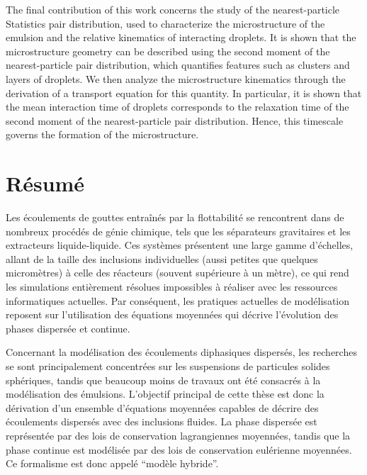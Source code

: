 The final contribution of this work concerns the study of the nearest-particle Statistics pair distribution, used to characterize the microstructure of the emulsion and the relative kinematics   of interacting droplets.
It is shown that the microstructure geometry can be described using the second moment of the nearest-particle pair distribution, which quantifies features such as clusters and layers of droplets.
We then analyze the microstructure kinematics through the derivation of a transport equation for this quantity.
In particular, it is shown that the mean interaction time of droplets corresponds to the relaxation time of the second moment of the nearest-particle pair distribution. 
Hence, this timescale governs the formation of the microstructure.




\newpage
\chapter*{\centering R\'esum\'e}

 
Les \'ecoulements de gouttes entra\^in\'es par la flottabilit\'e se rencontrent dans de nombreux proc\'ed\'es de g\'enie chimique, tels que les s\'eparateurs gravitaires et les extracteurs liquide-liquide.
Ces syst\`emes pr\'esentent une large gamme d'\'echelles, allant de la taille des inclusions individuelles (aussi petites que quelques microm\`etres) \`a celle des r\'eacteurs (souvent sup\'erieure \`a un m\`etre), ce qui rend les simulations enti\`erement r\'esolues impossibles \`a r\'ealiser avec les ressources informatiques actuelles.
Par cons\'equent, les pratiques actuelles de mod\'elisation reposent sur l'utilisation des \'equations moyenn\'ees qui d\'ecrive l'\'evolution des phases dispers\'ee et continue.


Concernant la mod\'elisation des \'ecoulements diphasiques dispers\'es, les recherches se sont principalement concentr\'ees sur les suspensions de particules solides sph\'eriques, tandis que beaucoup moins de travaux ont \'et\'e consacr\'es \`a la mod\'elisation des \'emulsions.
L'objectif principal de cette th\`ese est donc la d\'erivation d'un ensemble d'\'equations moyen\-n\'ees capables de d\'ecrire des \'ecoulements dispers\'es avec des inclusions fluides. 
La phase dispers\'ee est repr\'esent\'ee par des lois de conservation lagrangiennes  moyenn\'ees, tandis que la phase continue est mod\'elis\'ee par des lois de conservation eul\'erienne moyenn\'ees.
Ce formalisme est donc appel\'e  ``mod\`ele hybride''.

